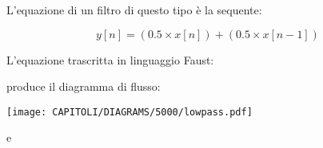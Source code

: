 L'equazione di un filtro di questo tipo è la sequente:

\begin{equation}
  y[n] = (0.5 \times x[n]) + (0.5 \times x[n-1])
\end{equation}

L'equazione trascritta in linguaggio Faust:



produce il diagramma di flusso:

\texttt{[image: CAPITOLI/DIAGRAMS/5000/lowpass.pdf]}


































e
